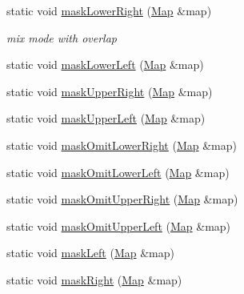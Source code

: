 \begin{DoxyCompactItemize}
\item 
static void \hyperlink{classInterpreter_a5bafd4ac63cb3dee9a6ddff172a0df02}{maskLowerRight} (\hyperlink{classMatrix}{Map} \&map)
\begin{DoxyCompactList}\small\item\em mix mode with overlap \item\end{DoxyCompactList}\item 
static void \hyperlink{classInterpreter_af02271dded17efbe47316706aad115f7}{maskLowerLeft} (\hyperlink{classMatrix}{Map} \&map)
\item 
static void \hyperlink{classInterpreter_a6741607033424bb90e95e59311941ed3}{maskUpperRight} (\hyperlink{classMatrix}{Map} \&map)
\item 
static void \hyperlink{classInterpreter_a1892fcf6bef01aa68c015c5a4a0c5f96}{maskUpperLeft} (\hyperlink{classMatrix}{Map} \&map)
\item 
static void \hyperlink{classInterpreter_a5aab0968d1a9c62fd20e1f11446deb73}{maskOmitLowerRight} (\hyperlink{classMatrix}{Map} \&map)
\item 
static void \hyperlink{classInterpreter_a849719043f4eef44634a9b5eb3e3561e}{maskOmitLowerLeft} (\hyperlink{classMatrix}{Map} \&map)
\item 
static void \hyperlink{classInterpreter_a83c078f3465a96026dbbc1ef3d7d120b}{maskOmitUpperRight} (\hyperlink{classMatrix}{Map} \&map)
\item 
static void \hyperlink{classInterpreter_a6232cdb6a8637bac127df9d19e8fd705}{maskOmitUpperLeft} (\hyperlink{classMatrix}{Map} \&map)
\item 
static void \hyperlink{classInterpreter_a454e31b3c1d0640be317c82c8b1b659d}{maskLeft} (\hyperlink{classMatrix}{Map} \&map)
\item 
static void \hyperlink{classInterpreter_abdfaacb7134b907d16a412ec1f80364b}{maskRight} (\hyperlink{classMatrix}{Map} \&map)
\end{DoxyCompactItemize}
